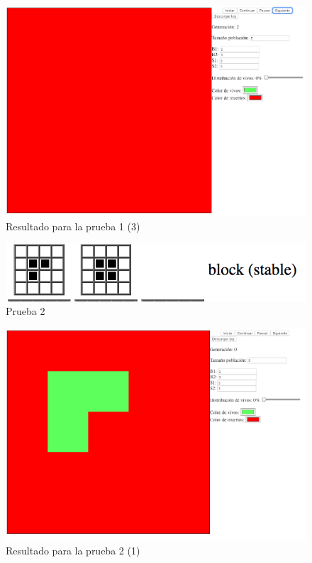 	\begin{figure}[H]
		\begin{center}
			\includegraphics[scale=.3]{GOL/img/test1-3.png}
			\caption{Resultado para la prueba 1 (3)}
			\label{fig:gol5}
		\end{center}
	\end{figure}

	\begin{figure}[H]
		\begin{center}
			\includegraphics[scale=.5]{GOL/img/2.png}
			\caption{Prueba 2}
			\label{fig:gol4}
		\end{center}
	\end{figure}

	\begin{figure}[H]
		\begin{center}
			\includegraphics[scale=.3]{GOL/img/test2-1.png}
			\caption{Resultado para la prueba 2 (1)}
			\label{fig:gol5}
		\end{center}
	\end{figure}

